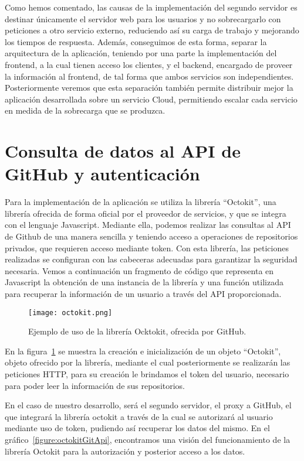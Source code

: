 Como hemos comentado, las causas de la implementación del segundo servidor
es destinar únicamente el servidor web para los usuarios y no sobrecargarlo
con peticiones a otro servicio externo, reduciendo así su carga de trabajo
y mejorando los tiempos de respuesta. Además, conseguimos de esta forma,
separar la arquitectura de la aplicación, teniendo por una parte la
implementación del frontend, a la cual tienen acceso los clientes, y el
backend, encargado de proveer la información al frontend, de tal forma que
ambos servicios son independientes.
Posteriormente veremos que esta separación también permite distribuir mejor
la aplicación desarrollada sobre un servicio Cloud, permitiendo escalar
cada servicio en medida de la sobrecarga que se produzca.


\section{Consulta de datos al API de GitHub y autenticación}

Para la implementación de la aplicación se utiliza la librería
“Octokit”, una librería ofrecida de forma oficial
por el proveedor de servicios, y que se integra con el lenguaje Javascript.
Mediante ella, podemos realizar las consultas al API de Github de una
manera sencilla y teniendo acceso a operaciones de repositorios privados,
que requieren acceso mediante token. Con esta librería, las peticiones
realizadas se configuran con las cabeceras adecuadas para garantizar la
seguridad necesaria. Vemos a continuación un fragmento de código que
representa en Javascript la obtención de una instancia de la librería y una
función utilizada para recuperar la información de un usuario a través del
API proporcionada.


\begin{figure}[h!]
  \centerline{\texttt{[image: octokit.png]}}
  \caption{Ejemplo de uso de la librería Ocktokit, ofrecida por GitHub.}
  \label{figure:octokit}
\end{figure}

En la figura~\ref{figure:octokit} se muestra la creación e inicialización
de un objeto ``Octokit'', objeto ofrecido por la librería, mediante el cual
posteriormente se realizarán las peticiones HTTP, para su creación le
brindamos el token del usuario, necesario para poder leer la información de
sus repositorios.

En el caso de nuestro desarrollo, será el segundo servidor, el proxy a
GitHub, el que integrará la librería octokit a través de la cual se
autorizará al usuario mediante uso de token, pudiendo así recuperar los
datos del mismo. En el gráfico~\ref{figure:octokitGitApi}, encontramos una
visión del funcionamiento de la librería Octokit para la autorización y
posterior acceso a los datos.

